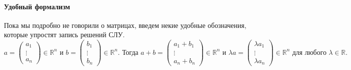 \paragraph{Удобный формализм}
Пока мы подробно не говорили о матрицах, введем некие удобные обозначения, которые упростят запись решений СЛУ. 
\[
a=
\begin{pmatrix}
{a_1}\\{\vdots}\\{a_n}
\end{pmatrix}
\in\mathbb R^n
\text{ и }
b=
\begin{pmatrix}
{b_1}\\{\vdots}\\{b_n}
\end{pmatrix}
\in\mathbb R^n.
\text{ Тогда }
a + b =
\begin{pmatrix}
{a_1 + b_1}\\{\vdots}\\{a_n + b_n}
\end{pmatrix}
\in\mathbb R^n
\text{ и }
\lambda a =
\begin{pmatrix}
{\lambda a_1}\\{\vdots}\\{\lambda a_n}
\end{pmatrix}
\in\mathbb R^n\text{ для любого }\lambda\in\mathbb R.
\]

